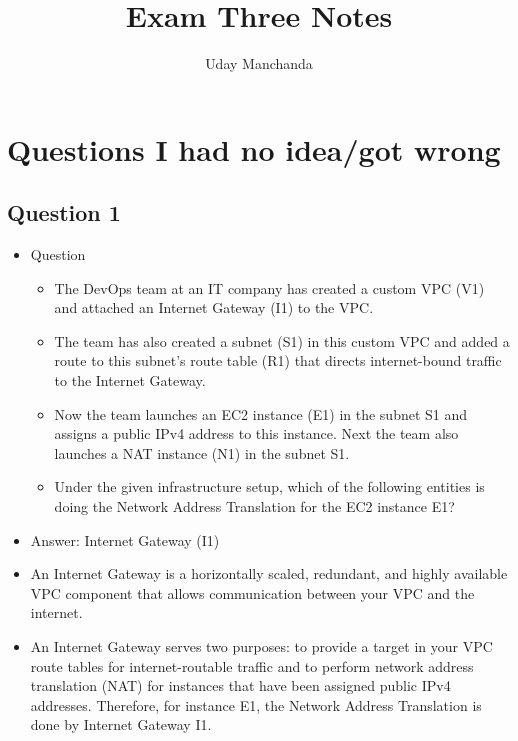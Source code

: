 \documentclass[]{scrartcl}
\title{Exam Three Notes}
\author{Uday Manchanda}
\begin{document}
\maketitle

\section{Questions I had no idea/got wrong}

\subsection{Question 1}
\begin{itemize}
	\item Question
	\begin{itemize}
		\item The DevOps team at an IT company has created a custom VPC (V1) and attached an Internet Gateway (I1) to the VPC. 
		\item The team has also created a subnet (S1) in this custom VPC and added a route to this subnet's route table (R1) that directs internet-bound traffic to the Internet Gateway. 
		\item Now the team launches an EC2 instance (E1) in the subnet S1 and assigns a public IPv4 address to this instance. Next the team also launches a NAT instance (N1) in the subnet S1.
		\item Under the given infrastructure setup, which of the following entities is doing the Network Address Translation for the EC2 instance E1?
	\end{itemize}
	\item Answer: Internet Gateway (I1)
	\item An Internet Gateway is a horizontally scaled, redundant, and highly available VPC component that allows communication between your VPC and the internet.
	\item An Internet Gateway serves two purposes: to provide a target in your VPC route tables for internet-routable traffic and to perform network address translation (NAT) for instances that have been assigned public IPv4 addresses. Therefore, for instance E1, the Network Address Translation is done by Internet Gateway I1.
\end{itemize}
\end{document}
